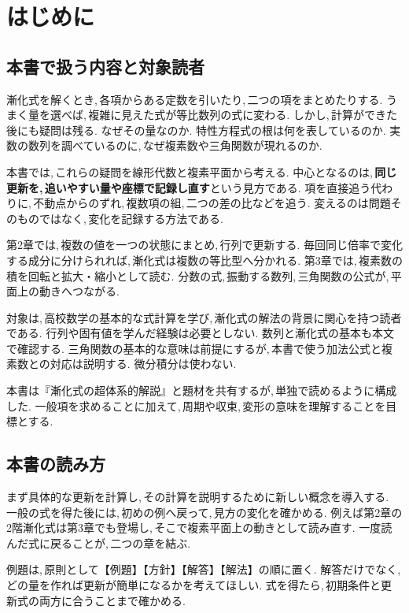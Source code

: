 \chapter{はじめに}\label{章：はじめに}
\begin{bookcolumns}
\section{本書で扱う内容と対象読者}\label{節：内容と対象読者}

漸化式を解くとき,\,各項からある定数を引いたり,\,二つの項をまとめたりする.
うまく量を選べば,\,複雑に見えた式が等比数列の式に変わる.
しかし,\,計算ができた後にも疑問は残る.
なぜその量なのか. 特性方程式の根は何を表しているのか.
実数の数列を調べているのに,\,なぜ複素数や三角関数が現れるのか.

本書では,\,これらの疑問を線形代数と複素平面から考える.
中心となるのは,\,\textbf{同じ更新を,\,追いやすい量や座標で記録し直す}という見方である.
項を直接追う代わりに,\,不動点からのずれ,\,複数項の組,\,二つの差の比などを追う.
変えるのは問題そのものではなく,\,変化を記録する方法である.

第2章では,\,複数の値を一つの状態にまとめ,\,行列で更新する.
毎回同じ倍率で変化する成分に分けられれば,\,漸化式は複数の等比型へ分かれる.
第3章では,\,複素数の積を回転と拡大・縮小として読む.
分数の式,\,振動する数列,\,三角関数の公式が,\,平面上の動きへつながる.

対象は,\,高校数学の基本的な式計算を学び,\,漸化式の解法の背景に関心を持つ読者である.
行列や固有値を学んだ経験は必要としない.
数列と漸化式の基本も本文で確認する.
三角関数の基本的な意味は前提にするが,\,本書で使う加法公式と複素数との対応は説明する.
微分積分は使わない.

本書は『漸化式の超体系的解説』と題材を共有するが,\,単独で読めるように構成した.
一般項を求めることに加えて,\,周期や収束,\,変形の意味を理解することを目標とする.

\section{本書の読み方}\label{節：本書の読み方}

まず具体的な更新を計算し,\,その計算を説明するために新しい概念を導入する.
一般の式を得た後には,\,初めの例へ戻って,\,見方の変化を確かめる.
例えば第2章の2階漸化式は第3章でも登場し,\,そこで複素平面上の動きとして読み直す.
一度読んだ式に戻ることが,\,二つの章を結ぶ.

例題は,\,原則として【例題】【方針】【解答】【解法】の順に置く.
解答だけでなく,\,どの量を作れば更新が簡単になるかを考えてほしい.
式を得たら,\,初期条件と更新式の両方に合うことまで確かめる.


\end{bookcolumns}
